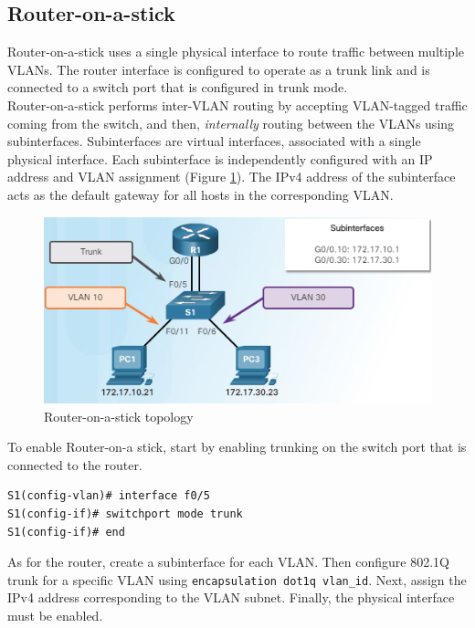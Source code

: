 \subsection{Router-on-a-stick}

Router-on-a-stick uses a single physical interface to route traffic between multiple VLANs. The router interface is configured to operate as a trunk link and is connected to a switch port that is configured in trunk mode. \\

Router-on-a-stick performs inter-VLAN routing by accepting VLAN-tagged traffic coming from the switch, and then, \emph{internally} routing between the VLANs using subinterfaces. Subinterfaces are virtual interfaces, associated with a single physical interface. Each subinterface is independently configured with an IP address and VLAN assignment (Figure \ref{InterVLAN}). The IPv4 address of the subinterface acts as the default gateway for all hosts in the corresponding VLAN.\\

\begin{figure}[hbtp]
\caption{Router-on-a-stick topology}\label{InterVLAN}
\centering
\includegraphics[scale=1]{pictures/InterVLAN.PNG}
\end{figure}


To enable Router-on-a stick, start by enabling trunking on the switch port that is connected to the router.

\begin{verbatim}
S1(config-vlan)# interface f0/5
S1(config-if)# switchport mode trunk
S1(config-if)# end
\end{verbatim}

As for the router, create a subinterface for each VLAN. Then configure 802.1Q trunk for a specific VLAN using \verb|encapsulation dot1q vlan_id|. Next, assign the IPv4 address corresponding to the VLAN subnet. Finally, the physical interface must be enabled. 

